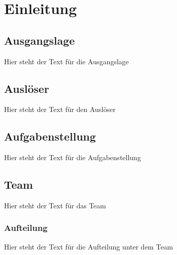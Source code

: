 \chapter{Einleitung}
\label{cha:Einleitung}

\section{Ausgangslage}
Hier steht der Text für die Ausgangslage

\section{Auslöser}
Hier steht der Text für den Auslöser

\section{Aufgabenstellung}
Hier steht der Text für die Aufgabenstellung

\section{Team}
Hier steht der Text für das Team

\subsection{Aufteilung}
Hier steht der Text für die Aufteilung unter dem Team
